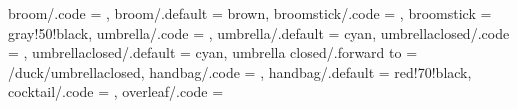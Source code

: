 {  broom/.code               = \duck@broomtrue
                              \def\duck@broom{#1},
  broom/.default            = brown,
  broomstick/.code          = \def\duck@broomstick{#1},
  broomstick                = gray!50!black,  
  umbrella/.code            = \duck@umbrellatrue
                              \def\duck@umbrella{#1},
  umbrella/.default         = cyan,      
  umbrellaclosed/.code      = \duck@umbrellaclosedtrue
                              \def\duck@umbrellaclosed{#1},
  umbrellaclosed/.default   = cyan,    
  umbrella closed/.forward to  = /duck/umbrellaclosed,
  handbag/.code             = \duck@handbagtrue
                              \def\duck@handbag{#1},
  handbag/.default          = red!70!black,  
  cocktail/.code             = \duck@cocktailtrue,
  overleaf/.code            = \duck@overleaftrue 
                              \def\duck@body{duck@overleafcol}
                              \duck@graduatetrue
                              \def\duck@graduate{black}
                              \duck@squareglassestrue
                              \def\duck@squareglasses{black}
}

